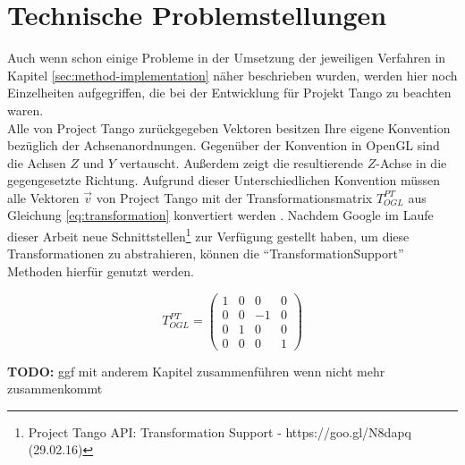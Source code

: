 \section{Technische Problemstellungen}

Auch wenn schon einige Probleme in der Umsetzung der jeweiligen Verfahren in Kapitel \ref{sec:method-implementation} näher beschrieben wurden, werden hier noch Einzelheiten aufgegriffen, die bei der Entwicklung für Projekt Tango zu beachten waren. \\

Alle von Project Tango zurückgegeben Vektoren besitzen Ihre eigene Konvention bezüglich der Achsenanordnungen. Gegenüber der Konvention in OpenGL sind die Achsen \(Z\) und \(Y\) vertauscht. Außerdem zeigt die resultierende \(Z\)-Achse in die gegengesetzte Richtung. Aufgrund dieser Unterschiedlichen Konvention müssen alle Vektoren \(\vec{v}\) von Project Tango mit der Transformationsmatrix \(T_{OGL}^{PT}\) aus Gleichung \ref{eq:transformation} konvertiert werden \citep{Proje15:online}. Nachdem Google im Laufe dieser Arbeit neue Schnittstellen\footnote{Project Tango API: Transformation Support - https://goo.gl/N8dapq (29.02.16)} zur Verfügung gestellt haben, um diese Transformationen zu abstrahieren, können die \enquote{TransformationSupport} Methoden hierfür genutzt werden.

\begin{equation} \label{eq:transformation}
T_{OGL}^{PT} =\left( \begin{matrix} 1&0&0&0\\0&0&-1&0\\0&1&0&0\\0&0&0&1 \end{matrix} \right)
\end{equation}

\textbf{TODO:} ggf mit anderem Kapitel zusammenführen wenn nicht mehr zusammenkommt
